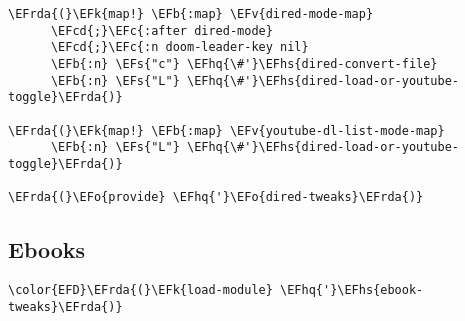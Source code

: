 \documentclass[a4wide,10pt]{article}
\newcommand{\EFc}[1]{\textcolor{EFc}{#1}} %
\newcommand{\EFcd}[1]{\textcolor{EFcd}{#1}} %
\newcommand{\EFs}[1]{\textcolor{EFs}{#1}} %
\newcommand{\EFk}[1]{\textcolor{EFk}{#1}} %
\newcommand{\EFb}[1]{\textcolor{EFb}{#1}} %
\newcommand{\EFv}[1]{\textcolor{EFv}{#1}} %
\newcommand{\EFo}[1]{\textcolor{EFo}{#1}} %
\newcommand{\EFhq}[1]{\textcolor{EFhq}{#1}} %
\newcommand{\EFhs}[1]{\textcolor{EFhs}{#1}} %
\newcommand{\EFrda}[1]{\textcolor{EFrda}{#1}} %
\begin{document}
\begin{Code}
\begin{Verbatim}
\EFrda{(}\EFk{map!} \EFb{:map} \EFv{dired-mode-map}
      \EFcd{;}\EFc{:after dired-mode}
      \EFcd{;}\EFc{:n doom-leader-key nil}
      \EFb{:n} \EFs{"c"} \EFhq{\#'}\EFhs{dired-convert-file}
      \EFb{:n} \EFs{"L"} \EFhq{\#'}\EFhs{dired-load-or-youtube-toggle}\EFrda{)}

\EFrda{(}\EFk{map!} \EFb{:map} \EFv{youtube-dl-list-mode-map}
      \EFb{:n} \EFs{"L"} \EFhq{\#'}\EFhs{dired-load-or-youtube-toggle}\EFrda{)}

\EFrda{(}\EFo{provide} \EFhq{'}\EFo{dired-tweaks}\EFrda{)}
\end{Verbatim}
\end{Code}
\subsection{Ebooks}
\label{sec:org0d1a7c6}
\begin{Code}
\begin{Verbatim}
\color{EFD}\EFrda{(}\EFk{load-module} \EFhq{'}\EFhs{ebook-tweaks}\EFrda{)}
\end{Verbatim}
\end{Code}
\end{document}
